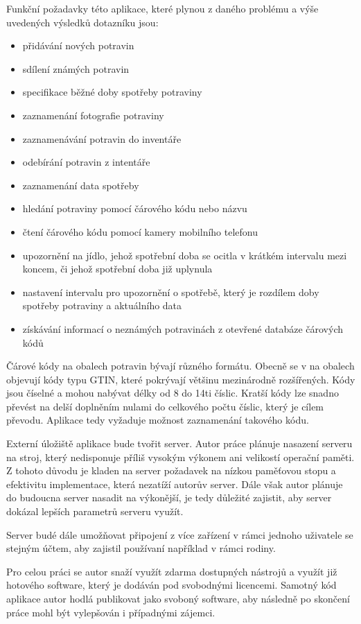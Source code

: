 \documentclass[thesis=B,czech]{FITthesis}[2013/10/20]
\begin{document}
Funkční požadavky této aplikace, které plynou z daného problému a výše uvedených výsledků dotazníku jsou:

\begin{itemize}
  \item přidávání nových potravin
  \item sdílení známých potravin
  \item specifikace běžné doby spotřeby potraviny
  \item zaznamenání fotografie potraviny
  \item zaznamenávání potravin do inventáře
  \item odebírání potravin z intentáře
  \item zaznamenání data spotřeby
  \item hledání potraviny pomocí čárového kódu nebo názvu
  \item čtení čárového kódu pomocí kamery mobilního telefonu
  \item upozornění na jídlo, jehož spotřební doba se ocitla v krátkém intervalu mezi koncem, či jehož spotřební doba již uplynula
  \item nastavení intervalu pro upozornění o spotřebě, který je rozdílem doby spotřeby potraviny a aktuálního data
  \item získávání informací o neznámých potravinách z otevřené databáze čárových kódů
\end{itemize}

Čárové kódy na obalech potravin bývají různého formátu. Obecně se v na obalech objevují kódy typu GTIN, které pokrývají většinu mezinárodně rozšířených. Kódy jsou číselné a mohou nabývat délky od 8 do 14ti číslic. Kratší kódy lze snadno převést na delší doplněním nulami do celkového počtu číslic, který je cílem převodu. Aplikace tedy vyžaduje možnost zaznamenání takového kódu.

Externí úložiště aplikace bude tvořit server. Autor práce plánuje nasazení serveru na stroj, který nedisponuje příliš vysokým výkonem ani velikostí operační paměti. Z tohoto důvodu je kladen na server požadavek na nízkou paměťovou stopu a efektivitu implementace, která nezatíží autorův server. Dále však autor plánuje do budoucna server nasadit na výkonější, je tedy důležité zajistit, aby server dokázal lepších parametrů serveru využít.

Server budé dále umožňovat připojení z více zařízení v rámci jednoho uživatele se stejným účtem, aby zajistil používaní například v rámci rodiny. 

Pro celou práci se autor snaží využít zdarma dostupných nástrojů a využít již hotového software, který je dodáván pod svobodnými licencemi. Samotný kód aplikace autor hodlá publikovat jako svoboný software, aby následně po skončení práce mohl být vylepšován i případnými zájemci.
\end{document}
